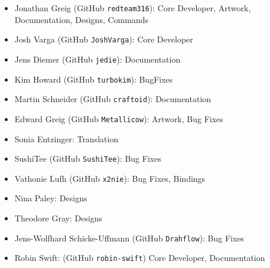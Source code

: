 \begin{itemize}
\item
  Jonathan Greig (GitHub \texttt{redteam316}): Core Developer, Artwork,
  Documentation, Designs, Commands
\item
  Josh Varga (GitHub \texttt{JoshVarga}): Core Developer
\item
  Jens Diemer (GitHub \texttt{jedie}): Documentation
\item
  Kim Howard (GitHub \texttt{turbokim}): BugFixes
\item
  Martin Schneider (GitHub \texttt{craftoid}): Documentation
\item
  Edward Greig (GitHub \texttt{Metallicow}): Artwork, Bug Fixes
\item
  Sonia Entzinger: Translation
\item
  SushiTee (GitHub \texttt{SushiTee}): Bug Fixes
\item
  Vathonie Lufh (GitHub \texttt{x2nie}): Bug Fixes, Bindings
\item
  Nina Paley: Designs
\item
  Theodore Gray: Designs
\item
  Jens-Wolfhard Schicke-Uffmann (GitHub \texttt{Drahflow}): Bug Fixes
\item
  Robin Swift: (GitHub \texttt{robin-swift}) Core Developer,
  Documentation
\end{itemize}
